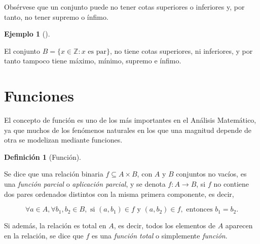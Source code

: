 \documentclass[
  a4paper,
]{scrreport}
\theoremstyle{definition}
\newtheorem{example}{Ejemplo}[chapter]
\theoremstyle{plain}
\theoremstyle{plain}
\theoremstyle{definition}
\newtheorem{definition}{Definición}[chapter]
\theoremstyle{plain}
\theoremstyle{remark}
\begin{document}
\begin{tcolorbox}[enhanced jigsaw, toptitle=1mm, rightrule=.15mm, colbacktitle=quarto-callout-warning-color!10!white, bottomtitle=1mm, breakable, leftrule=.75mm, titlerule=0mm, coltitle=black, opacityback=0, colback=white, toprule=.15mm, title=\textcolor{quarto-callout-warning-color}{\faExclamationTriangle}\hspace{0.5em}{Advertencia}, arc=.35mm, bottomrule=.15mm, colframe=quarto-callout-warning-color-frame, left=2mm, opacitybacktitle=0.6]

Obsérvese que un conjunto puede no tener cotas superiores o inferiores
y, por tanto, no tener supremo o ínfimo.

\end{tcolorbox}

\begin{example}[]\protect\hypertarget{exm-no-supremo-infimio}{}\label{exm-no-supremo-infimio}

El conjunto \(B=\{x\in\mathbb{Z}: x \mbox{ es par}\}\), no tiene cotas
superiores, ni inferiores, y por tanto tampoco tiene máximo, mínimo,
supremo e ínfimo.

\end{example}

\hypertarget{funciones}{%
\section{Funciones}\label{funciones}}

El concepto de función es uno de los más importantes en el Análisis
Matemático, ya que muchos de los fenómenos naturales en los que una
magnitud depende de otra se modelizan mediante funciones.

\begin{definition}[Función]\protect\hypertarget{def-funcion}{}\label{def-funcion}

Se dice que una relación binaria \(f \subseteq A \times B\), con \(A\) y
\(B\) conjuntos no vacíos, es una \emph{función parcial} o
\emph{aplicación parcial}, y se denota \(f:A\rightarrow B\), si \(f\) no
contiene dos pares ordenados distintos con la misma primera componente,
es decir,

\[
\forall a \in A, \forall b_1, b_2 \in B, \mbox{ si } (a,b_1) \in f \mbox{ y } (a,b_2) \in f, \mbox{ entonces } b_1 = b_2.
\]

Si además, la relación es total en \(A\), es decir, todos los elementos
de \(A\) aparecen en la relación, se dice que \(f\) es una \emph{función
total} o simplemente \emph{función}.

\end{definition}
\end{document}
